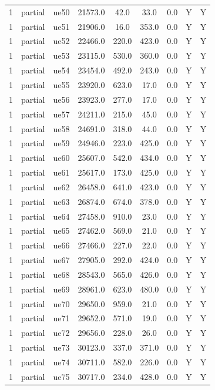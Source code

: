 \begin{table}[ht]
\begin{tabular}{|c|c|c|c|c|c|c|c|c|}
1 & partial & ue50 & 21573.0 & 42.0 & 33.0 & 0.0 & Y & Y \\
1 & partial & ue51 & 21906.0 & 16.0 & 353.0 & 0.0 & Y & Y \\
1 & partial & ue52 & 22466.0 & 220.0 & 423.0 & 0.0 & Y & Y \\
1 & partial & ue53 & 23115.0 & 530.0 & 360.0 & 0.0 & Y & Y \\
1 & partial & ue54 & 23454.0 & 492.0 & 243.0 & 0.0 & Y & Y \\
1 & partial & ue55 & 23920.0 & 623.0 & 17.0 & 0.0 & Y & Y \\
1 & partial & ue56 & 23923.0 & 277.0 & 17.0 & 0.0 & Y & Y \\
1 & partial & ue57 & 24211.0 & 215.0 & 45.0 & 0.0 & Y & Y \\
1 & partial & ue58 & 24691.0 & 318.0 & 44.0 & 0.0 & Y & Y \\
1 & partial & ue59 & 24946.0 & 223.0 & 425.0 & 0.0 & Y & Y \\
1 & partial & ue60 & 25607.0 & 542.0 & 434.0 & 0.0 & Y & Y \\
1 & partial & ue61 & 25617.0 & 173.0 & 425.0 & 0.0 & Y & Y \\
1 & partial & ue62 & 26458.0 & 641.0 & 423.0 & 0.0 & Y & Y \\
1 & partial & ue63 & 26874.0 & 674.0 & 378.0 & 0.0 & Y & Y \\
1 & partial & ue64 & 27458.0 & 910.0 & 23.0 & 0.0 & Y & Y \\
1 & partial & ue65 & 27462.0 & 569.0 & 21.0 & 0.0 & Y & Y \\
1 & partial & ue66 & 27466.0 & 227.0 & 22.0 & 0.0 & Y & Y \\
1 & partial & ue67 & 27905.0 & 292.0 & 424.0 & 0.0 & Y & Y \\
1 & partial & ue68 & 28543.0 & 565.0 & 426.0 & 0.0 & Y & Y \\
1 & partial & ue69 & 28961.0 & 623.0 & 480.0 & 0.0 & Y & Y \\
1 & partial & ue70 & 29650.0 & 959.0 & 21.0 & 0.0 & Y & Y \\
1 & partial & ue71 & 29652.0 & 571.0 & 19.0 & 0.0 & Y & Y \\
1 & partial & ue72 & 29656.0 & 228.0 & 26.0 & 0.0 & Y & Y \\
1 & partial & ue73 & 30123.0 & 337.0 & 371.0 & 0.0 & Y & Y \\
1 & partial & ue74 & 30711.0 & 582.0 & 226.0 & 0.0 & Y & Y \\
1 & partial & ue75 & 30717.0 & 234.0 & 428.0 & 0.0 & Y & Y \\

\end{tabular}
\end{table}
